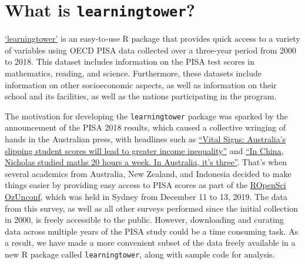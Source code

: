 \hypertarget{what-is-learningtower}{%
\section{\texorpdfstring{What is
\texttt{learningtower}?}{What is learningtower?}}\label{what-is-learningtower}}

\href{https://cran.r-project.org/web/packages/learningtower/index.html}{`learningtower'}
is an easy-to-use R package that provides quick access to a variety of
variables using OECD PISA data collected over a three-year period from
2000 to 2018. This dataset includes information on the PISA test scores
in mathematics, reading, and science. Furthermore, these datasets
include information on other socioeconomic aspects, as well as
information on their school and its facilities, as well as the nations
participating in the program.

The motivation for developing the \texttt{learningtower} package was
sparked by the announcement of the PISA 2018 results, which caused a
collective wringing of hands in the Australian press, with headlines
such as
\href{https://theconversation.com/vital-signs-australias-slipping-student-scores-will-lead-to-greater-income-inequality-128301}{``Vital
Signs: Australia's slipping student scores will lead to greater income
inequality''} and
\href{https://www.smh.com.au/education/in-china-nicholas-studied-maths-20-hours-a-week-in-australia-it-s-three-20191203-p53ggv.html}{``In
China, Nicholas studied maths 20 hours a week. In Australia, it's
three''}. That's when several academics from Australia, New Zealand, and
Indonesia decided to make things easier by providing easy access to PISA
scores as part of the \href{https://ozunconf19.ropensci.org/}{ROpenSci
OzUnconf}, which was held in Sydney from December 11 to 13, 2019. The
data from this survey, as well as all other surveys performed since the
initial collection in 2000, is freely accessible to the public. However,
downloading and curating data across multiple years of the PISA study
could be a time consuming task. As a result, we have made a more
convenient subset of the data freely available in a new R package called
\texttt{learningtower}, along with sample code for analysis.

